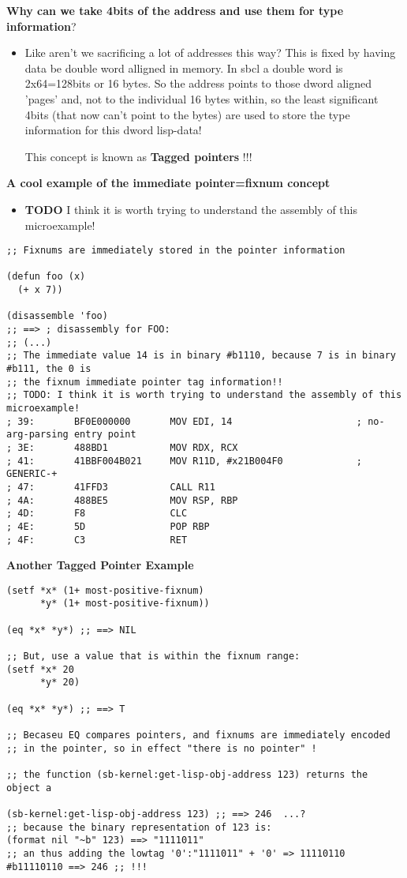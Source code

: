 \documentclass[11pt]{article}
\begin{document}
\textbf{Why can we take 4bits of the address and use them for type information}?
\begin{itemize}
\item Like aren't we sacrificing a lot of addresses this way? This is fixed by having
data be double word alligned in memory. In sbcl a double word is 2x64=128bits or
16 bytes. So the address points to those dword aligned 'pages' and, not to 
the individual 16 bytes within, so the least significant 4bits (that now can't
point to the bytes) are used to store the type information for this dword lisp-data!

This concept is known as \textbf{Tagged pointers} !!!
\end{itemize}

\textbf{A cool example of the immediate pointer=fixnum concept}
\begin{itemize}
\item \textbf{TODO} I think it is worth trying to understand the assembly of this microexample!
\end{itemize}
\begin{verbatim}
;; Fixnums are immediately stored in the pointer information

(defun foo (x)
  (+ x 7))

(disassemble 'foo)
;; ==> ; disassembly for FOO:
;; (...)
;; The immediate value 14 is in binary #b1110, because 7 is in binary #b111, the 0 is
;; the fixnum immediate pointer tag information!!
;; TODO: I think it is worth trying to understand the assembly of this microexample!
; 39:       BF0E000000       MOV EDI, 14                      ; no-arg-parsing entry point
; 3E:       488BD1           MOV RDX, RCX
; 41:       41BBF004B021     MOV R11D, #x21B004F0             ; GENERIC-+
; 47:       41FFD3           CALL R11
; 4A:       488BE5           MOV RSP, RBP
; 4D:       F8               CLC
; 4E:       5D               POP RBP
; 4F:       C3               RET
\end{verbatim}

\textbf{Another Tagged Pointer Example}
\begin{verbatim}
(setf *x* (1+ most-positive-fixnum)
      *y* (1+ most-positive-fixnum))

(eq *x* *y*) ;; ==> NIL

;; But, use a value that is within the fixnum range:
(setf *x* 20
      *y* 20)

(eq *x* *y*) ;; ==> T

;; Becaseu EQ compares pointers, and fixnums are immediately encoded
;; in the pointer, so in effect "there is no pointer" !

;; the function (sb-kernel:get-lisp-obj-address 123) returns the object a

(sb-kernel:get-lisp-obj-address 123) ;; ==> 246  ...?
;; because the binary representation of 123 is:
(format nil "~b" 123) ==> "1111011"
;; an thus adding the lowtag '0':"1111011" + '0' => 11110110
#b11110110 ==> 246 ;; !!!
\end{verbatim}
\end{document}
